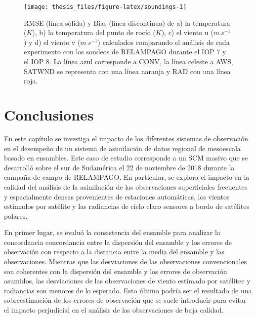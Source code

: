 \documentclass[12pt,oneside]{reedthesis}
\begin{document}
\begin{figure}

{\centering \texttt{[image: thesis\_files/figure-latex/soundings-1]} 

}

\caption{RMSE (línea sólida) y Bias (línea discontinua) de a) la temperatura (\(K\)), b) la temperatura del punto de rocío (\(K\)), c) el viento u (\(m\ s^{-1}\)) y d) el viento v (\(m\ s^{-1}\)) calculados comparando el análisis de cada experimento con los sondeos de RELAMPAGO durante el IOP 7 y el IOP 8. La línea azul corresponde a CONV, la línea celeste a AWS, SATWND se representa con una línea naranja y RAD con una línea roja.}\label{fig:soundings}
\end{figure}
\hypertarget{conclusiones}{%
\section{Conclusiones}\label{conclusiones}}

En este capítulo se investiga el impacto de los diferentes sistemas de observación en el desempeño de un sistema de asimilación de datos regional de mesoescala basado en ensambles. Este caso de estudio corresponde a un SCM masivo que se desarrolló sobre el sur de Sudamérica el 22 de noviembre de 2018 durante la campaña de campo de RELAMPAGO. En particular, se explora el impacto en la calidad del análisis de la asimilación de las observaciones superficiales frecuentes y espacialmente densas provenientes de estaciones automáticas, los vientos estimados por satélite y las radiancias de cielo claro sensores a bordo de satélites polares.

En primer lugar, se evaluó la consistencia del ensamble para analizar la concordancia concordancia entre la dispersión del ensamble y los errores de observación con respecto a la distancia entre la media del ensamble y las observaciones. Mientras que las desviaciones de las observaciones convencionales son coherentes con la dispersión del ensamble y los errores de observación asumidos, las desviaciones de las observaciones de viento estimado por satélitee y radiancias son menores de lo esperado. Esto último podría ser el resultado de una sobreestimación de los errores de observación que se suele introducir para evitar el impacto perjudicial en el análisis de las observaciones de baja calidad.
\end{document}
